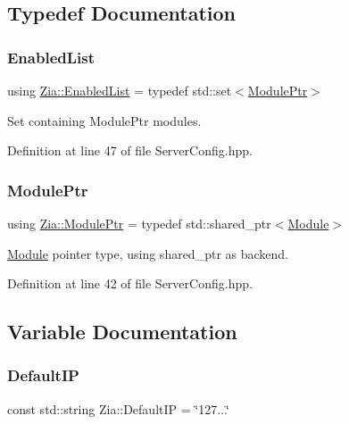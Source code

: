 \subsection{Typedef Documentation}
\mbox{\label{namespace_zia_a3076ef33a6c08b068cb8e444848ad33c}} 
\subsubsection{\texorpdfstring{Enabled\+List}{EnabledList}}
{\footnotesize\ttfamily using \hyperlink{namespace_zia_a3076ef33a6c08b068cb8e444848ad33c}{Zia\+::\+Enabled\+List} = typedef std\+::set$<$\hyperlink{namespace_zia_a26a1cd43d7216ed69ef26b99d8d12093}{Module\+Ptr}$>$}



Set containing Module\+Ptr modules. 



Definition at line 47 of file Server\+Config.\+hpp.

\mbox{\label{namespace_zia_a26a1cd43d7216ed69ef26b99d8d12093}} 
\subsubsection{\texorpdfstring{Module\+Ptr}{ModulePtr}}
{\footnotesize\ttfamily using \hyperlink{namespace_zia_a26a1cd43d7216ed69ef26b99d8d12093}{Zia\+::\+Module\+Ptr} = typedef std\+::shared\+\_\+ptr$<$\hyperlink{class_zia_1_1_module}{Module}$>$}



\hyperlink{class_zia_1_1_module}{Module} pointer type, using shared\+\_\+ptr as backend. 



Definition at line 42 of file Server\+Config.\+hpp.



\subsection{Variable Documentation}
\mbox{\label{namespace_zia_a40d4cbc794a3ff3df7017ff08173978f}} 
\subsubsection{\texorpdfstring{Default\+IP}{DefaultIP}}
{\footnotesize\ttfamily const std\+::string Zia\+::\+Default\+IP = \char`\"{}127...\char`\"{}}



